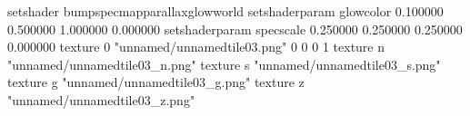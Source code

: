 setshader bumpspecmapparallaxglowworld
setshaderparam glowcolor 0.100000 0.500000 1.000000 0.000000
setshaderparam specscale 0.250000 0.250000 0.250000 0.000000
texture 0 "unnamed/unnamedtile03.png" 0 0 0 1
texture n "unnamed/unnamedtile03_n.png"
texture s "unnamed/unnamedtile03_s.png"
texture g "unnamed/unnamedtile03_g.png"
texture z "unnamed/unnamedtile03_z.png"